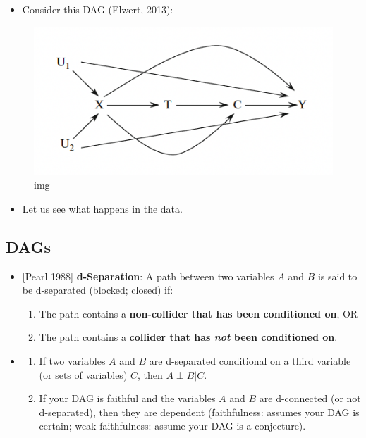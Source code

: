 \documentclass[11pt]{article}
\providecommand{\tightlist}{%
      \setlength{\itemsep}{0pt}\setlength{\parskip}{0pt}}
\begin{document}
\begin{itemize}
\tightlist
\item
  Consider this DAG (Elwert, 2013):
\end{itemize}

\begin{figure}
\centering
\includegraphics{../img/dag1.png}
\caption{img}
\end{figure}

\begin{itemize}
\tightlist
\item
  Let us see what happens in the data.
\end{itemize}

    \hypertarget{dags}{%
\subsection{DAGs}\label{dags}}

\begin{itemize}
\item
  {[}Pearl 1988{]} \textbf{d-Separation}: A path between two variables
  \(A\) and \(B\) is said to be d-separated (blocked; closed) if:

  \begin{enumerate}
  \def\labelenumi{\arabic{enumi}.}
  \tightlist
  \item
    The path contains a \textbf{non-collider that has been conditioned
    on}, OR
  \item
    The path contains a \textbf{collider that has \emph{not} been
    conditioned on}.
  \end{enumerate}
\item
  \begin{enumerate}
  \def\labelenumi{\arabic{enumi}.}
  \setcounter{enumi}{1}
  \tightlist
  \item
    If two variables \(A\) and \(B\) are d-separated conditional on a
    third variable (or sets of variables) \(C\), then \(A \perp B | C\).
  \item
    If your DAG is faithful and the variables \(A\) and \(B\) are
    d-connected (or not d-separated), then they are dependent
    (faithfulness: assumes your DAG is certain; weak faithfulness:
    assume your DAG is a conjecture).
  \end{enumerate}
\end{itemize}
\end{document}
